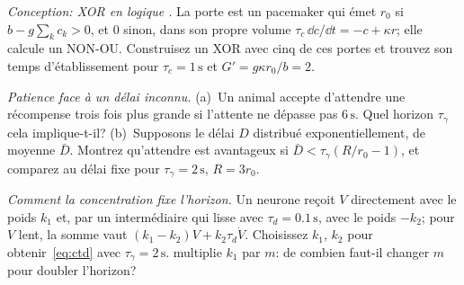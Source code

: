 \begin{exercise}[\lvlB]
\label{ex:05:6}
\emph{Conception: XOR en logique .} La porte est un pacemaker qui émet $r_0$ si $b-g\sum_kc_k>0$, et $0$ sinon, dans son propre volume $\tau_c\,\dd c/\dd t=-c+\kappa r$; elle calcule un NON-OU. Construisez un XOR avec cinq de ces portes et trouvez son temps d'établissement pour $\tau_c=1\,\text{s}$ et $G'=g\kappa r_0/b=2$.
\end{exercise}

\begin{exercise}[\lvlB]
\label{ex:05:7}
\emph{Patience face à un délai inconnu.} (a)~Un animal accepte d'attendre une récompense trois fois plus grande si l'attente ne dépasse pas $6\,\text{s}$. Quel horizon $\tau_\gamma$ cela implique-t-il? (b)~Supposons le délai $D$ distribué exponentiellement, de moyenne $\bar D$. Montrez qu'attendre est avantageux si $\bar D<\tau_\gamma(R/r_0-1)$, et comparez au délai fixe pour $\tau_\gamma=2\,\text{s}$, $R=3r_0$.
\end{exercise}

\begin{exercise}[\lvlC]
\label{ex:05:8}
\emph{Comment la concentration fixe l'horizon.} Un neurone  reçoit $V$ directement avec le poids $k_1$ et, par un intermédiaire  qui lisse avec $\tau_d=0.1\,\text{s}$, avec le poids $-k_2$; pour $V$ lent, la somme vaut $(k_1-k_2)V+k_2\tau_d\dot V$. Choisissez $k_1$, $k_2$ pour obtenir~\eqref{eq:ctd} avec $\tau_\gamma=2\,\text{s}$.  multiplie $k_1$ par $m$: de combien faut-il changer $m$ pour doubler l'horizon?
\end{exercise}
